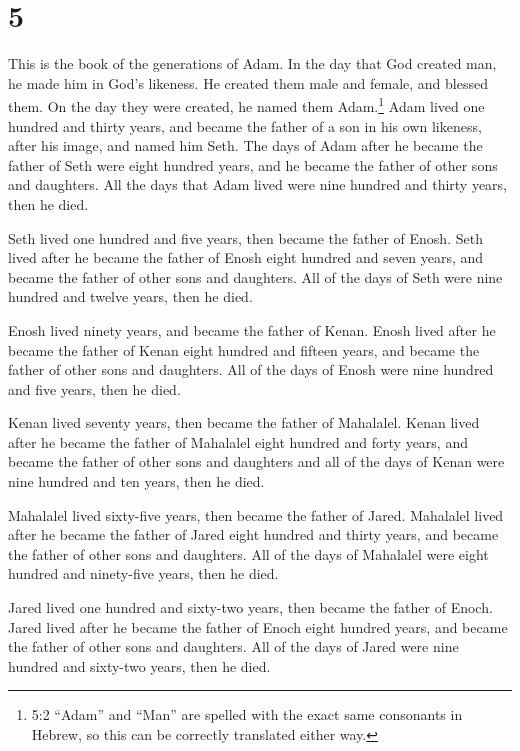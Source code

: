 \hypertarget{section-4}{%
\section{5}\label{section-4}}

 This is the book of the generations of Adam. In the day
that God created man, he made him in God's likeness.  He
created them male and female, and blessed them. On the day they were
created, he named them Adam.\footnote{5:2 ``Adam'' and ``Man'' are
  spelled with the exact same consonants in Hebrew, so this can be
  correctly translated either way.}  Adam lived one hundred
and thirty years, and became the father of a son in his own likeness,
after his image, and named him Seth.  The days of Adam after
he became the father of Seth were eight hundred years, and he became the
father of other sons and daughters.  All the days that Adam
lived were nine hundred and thirty years, then he died.

 Seth lived one hundred and five years, then became the
father of Enosh.  Seth lived after he became the father of
Enosh eight hundred and seven years, and became the father of other sons
and daughters.  All of the days of Seth were nine hundred
and twelve years, then he died.

 Enosh lived ninety years, and became the father of Kenan.
 Enosh lived after he became the father of Kenan eight
hundred and fifteen years, and became the father of other sons and
daughters.  All of the days of Enosh were nine hundred and
five years, then he died.

 Kenan lived seventy years, then became the father of
Mahalalel.  Kenan lived after he became the father of
Mahalalel eight hundred and forty years, and became the father of other
sons and daughters  and all of the days of Kenan were nine
hundred and ten years, then he died.

 Mahalalel lived sixty-five years, then became the father
of Jared.  Mahalalel lived after he became the father of
Jared eight hundred and thirty years, and became the father of other
sons and daughters.  All of the days of Mahalalel were
eight hundred and ninety-five years, then he died.

 Jared lived one hundred and sixty-two years, then became
the father of Enoch.  Jared lived after he became the
father of Enoch eight hundred years, and became the father of other sons
and daughters.  All of the days of Jared were nine hundred
and sixty-two years, then he died.

